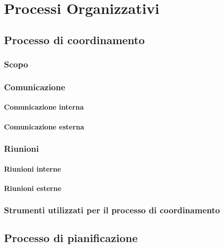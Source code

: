 \chapter{Processi Organizzativi}\label{Processi Organizzativi}

\section{Processo di coordinamento}\label{4.1}

\subsection{Scopo}\label{4.1.1}

\subsection{Comunicazione}\label{4.1.2}

\subsubsection{Comunicazione interna}\label{4.1.2.1}

\subsubsection{Comunicazione esterna}\label{4.1.2.2}

\subsection{Riunioni}\label{4.1.3}

\subsubsection{Riunioni interne}\label{4.1.3.1}

\subsubsection{Riunioni esterne}\label{4.1.3.2}

\subsection{Strumenti utilizzati per il processo di coordinamento}\label{4.1.4}

\section{Processo di pianificazione}\label{4.2}

